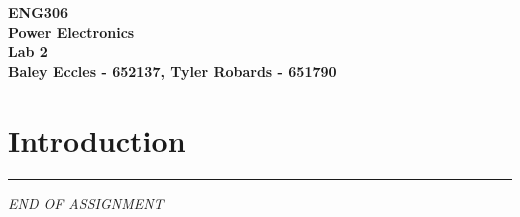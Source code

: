 \documentclass[12pt,a4paper]{article}
\begin{document}
\begin{center}
\textbf{\LARGE ENG306\\[6pt]
Power Electronics}\\[10pt]
\textbf{\large Lab 2\\[4pt]
Baley Eccles - 652137, Tyler Robards - 651790}\\
\end{center}

\section{Introduction}

\vfill
\hrule
\begin{center}
\textit{END OF ASSIGNMENT}
\end{center}
\end{document}
